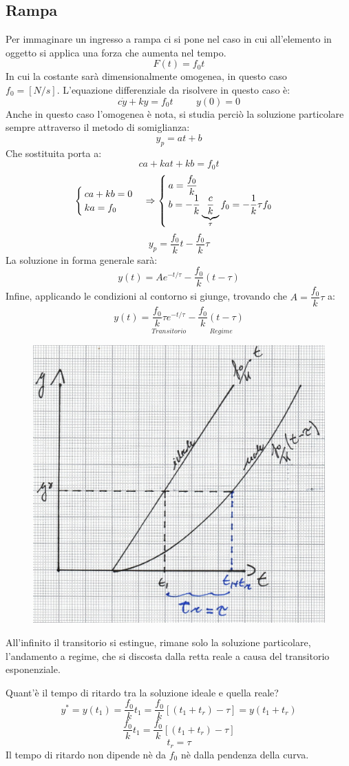 \documentclass[a4paper, 15pt]{article}
\begin{document}
\subsection{Rampa} 	
\begin{adjustwidth}{2in}{}		
	Per immaginare un ingresso a rampa ci si pone nel caso in cui all'elemento in oggetto si applica una forza che aumenta nel tempo.
	\[F(t) = f_0t\]
	In cui la costante sarà dimensionalmente omogenea, in questo caso \\  $ f_0 = [N/s] $.
	L'equazione differenziale da risolvere in questo caso è:
	\[ c\dot{y}  + ky = f_0t \hspace{1cm} y(0) = 0\]
	Anche in questo caso l'omogenea è nota, si studia perciò la soluzione particolare sempre attraverso il metodo di somiglianza: 
	\[y_p = at + b\]
	Che sostituita porta a:
	\[ca + kat + kb = f_0t\]
	\[\begin{cases}
		ca + kb = 0 \\
		ka = f_0
	\end{cases} \Rightarrow \begin{cases}
		a = \dfrac{f_0}{k} \\
		b = - \dfrac{1}{k} \underbrace{\dfrac{c}{k}}_\text{$ \tau $}f_0 = - \dfrac{1}{k}\tau f_0
	\end{cases}\]
	\[ y_p = \dfrac{f_0}{k}t - \dfrac{f_0}{k}\tau  \]
	La soluzione in forma generale sarà: 
	\[y(t) = Ae^{-t/\tau} - \dfrac{f_0}{k}(t-\tau)   \]
	Infine, applicando le condizioni al contorno si giunge, trovando che $A = \dfrac{f_0}{k}\tau$ a: 
	\[y(t) = \underset{Transitorio}{\dfrac{f_0}{k}\tau e^{-t/\tau}} - \underset{Regime}{\dfrac{f_0}{k}(t-\tau)}    \]
	\begin{figure}[H]
		\centering
		\includegraphics[width=0.4\linewidth]{fig/mm6}
		\label{fig:mm6}
	\end{figure}	
	All'infinito il transitorio si estingue, rimane solo la soluzione particolare, l'andamento a regime, che si discosta dalla retta reale a causa del transitorio esponenziale. \newline
	
	Quant'è il tempo di ritardo tra la soluzione ideale e quella reale?
	\[ y^* = y(t_1) = \dfrac{f_0}{k}t_1 = \dfrac{f_0}{k}[(t_1 + t_r)-\tau] =  y(t_1 + t_r) \]
	\[ \dfrac{f_0}{k}t_1 = \dfrac{f_0}{k}[(t_1 + t_r)-\tau] \]
	\[ t_r = \tau \]
	Il tempo di ritardo non dipende nè da $f_0$ nè dalla pendenza della curva. 
\end{adjustwidth}
\end{document}

